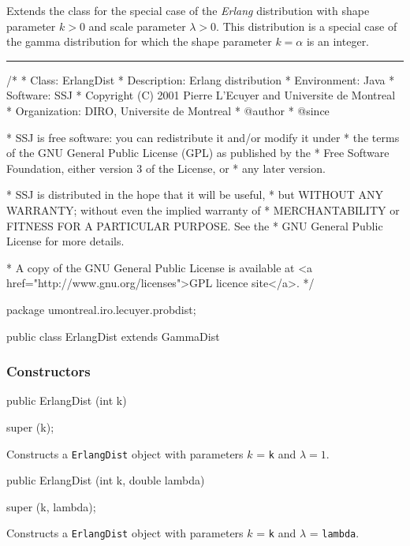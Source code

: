 
Extends the class  for the special case
of the {\em Erlang\/} distribution with
shape parameter $k > 0$ and scale parameter $\lambda > 0$.
This distribution is a special case of the gamma distribution
for which the shape parameter $k=\alpha$ is an integer.

\bigskip\hrule

\begin{code}
\begin{hide}
/*
 * Class:        ErlangDist
 * Description:  Erlang distribution
 * Environment:  Java
 * Software:     SSJ
 * Copyright (C) 2001  Pierre L'Ecuyer and Universite de Montreal
 * Organization: DIRO, Universite de Montreal
 * @author
 * @since

 * SSJ is free software: you can redistribute it and/or modify it under
 * the terms of the GNU General Public License (GPL) as published by the
 * Free Software Foundation, either version 3 of the License, or
 * any later version.

 * SSJ is distributed in the hope that it will be useful,
 * but WITHOUT ANY WARRANTY; without even the implied warranty of
 * MERCHANTABILITY or FITNESS FOR A PARTICULAR PURPOSE.  See the
 * GNU General Public License for more details.

 * A copy of the GNU General Public License is available at
   <a href="http://www.gnu.org/licenses">GPL licence site</a>.
 */
\end{hide}
package umontreal.iro.lecuyer.probdist;

public class ErlangDist extends GammaDist\begin{hide} {
\end{hide}\end{code}
\subsubsection* {Constructors}

\begin{code}

   public ErlangDist (int k)\begin{hide} {
      super (k);
   }\end{hide}
\end{code}
  \begin{tabb} Constructs a \texttt{ErlangDist} object with parameters
  $k$ = \texttt{k} and $\lambda=1$.
  \end{tabb}
\begin{code}

   public ErlangDist (int k, double lambda)\begin{hide} {
      super (k, lambda);
   }\end{hide}
\end{code}
  \begin{tabb} Constructs a \texttt{ErlangDist} object with parameters
  $k$ = \texttt{k}  and $\lambda$ = \texttt{lambda}.
  \end{tabb}

